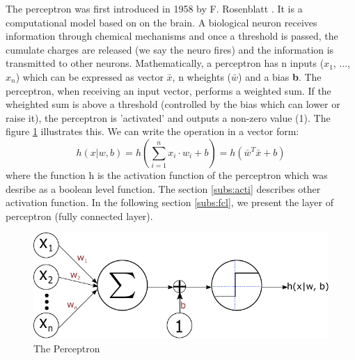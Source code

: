 The perceptron was first introduced in 1958 by F. Rosenblatt \cite{brain_perceptron_nodate}. It is a computational model based on on the brain. A biological neuron receives information through chemical mechanisms and once a threshold is passed, the cumulate charges are released (we say the neuro fires) and the information is transmitted to other neurons. \newline \newline
Mathematically, a perceptron has n inputs ($x_1$, ..., $x_n$) which can be expressed as vector \textbf{$\bar{x}$}, n wheights (\textbf{$\bar{w}$}) and a bias \textbf{b}. The perceptron, when receiving an input vector, performs a weighted sum. If the wheighted sum is above a threshold (controlled by the bias which can lower or raise it), the perceptron is 'activated' and outputs a non-zero value (1). The figure \ref{fig:perceptron} illustrates this. We can write the operation in a vector form:
$$ h(x| w, b) = h(\sum^{n}_{i=1} x_i \cdot w_i + b) = h ( \textbf{$\bar{w}$}^{T} \textbf{$\bar{x}$} + b) $$
where the function h is the activation function of the perceptron which was desribe as a boolean level function. The section \ref{subs:acti} describes other activation function. \newline \newline
In the following section \ref{subs:fcl}, we present the layer of perceptron (fully connected layer).
\begin{figure}[h]
    \centering
    \includegraphics[width=\textwidth]{Images/perceptron.pdf}
    \caption{The Perceptron}
    \label{fig:perceptron}
\end{figure}
